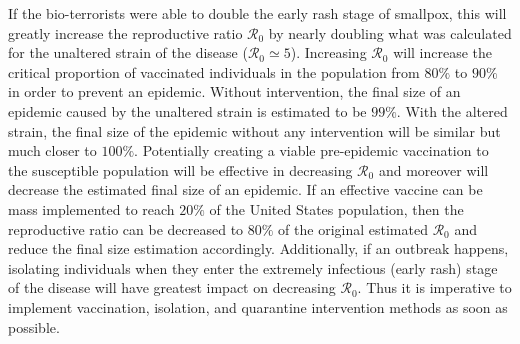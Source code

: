 If the bio-terrorists were able to double the early rash stage of smallpox, this will greatly increase the reproductive ratio $\mathcal R_0$ by nearly doubling what was calculated for the unaltered strain of the disease ($\mathcal R_0 \simeq 5$). Increasing $\mathcal R_0$ will increase the critical proportion of vaccinated individuals in the population from $80\%$ to $90\%$ in order to prevent an epidemic. Without intervention, the final size of an epidemic caused by the unaltered strain is estimated to be $99\%$. 	With the altered strain, the final size of the epidemic without any intervention will be similar but much closer to $100\%$. Potentially creating a viable pre-epidemic vaccination to the susceptible population will be effective in decreasing  $\mathcal R_0$ and moreover will decrease the estimated final size of an epidemic. If an effective vaccine can be mass implemented to reach $20\%$ of the United States population, then the reproductive ratio can be decreased to $80\%$ of the original estimated $\mathcal R_0$ and reduce the final size estimation accordingly. Additionally, if an outbreak happens, isolating individuals when they enter the extremely infectious (early rash) stage of the disease will have greatest impact on decreasing $\mathcal R_0$. Thus it is imperative to implement vaccination, isolation, and quarantine intervention methods as soon as possible. 
